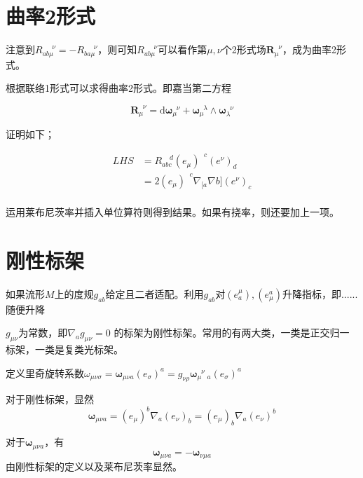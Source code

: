 \documentclass{ctexbook}
\begin{document}
\begin{e   quation}
\section{曲率2形式}

注意到$R_{ab\mu}^{\;\;\;\;\;\nu}=-R_{ba\mu}^{\;\;\;\;\;\nu}$，则可知$R_{ab\mu}^{\;\;\;\;\;\nu}$可以看作第$\mu,\nu$个2形式场$\bm{R}_{\mu}^{\;\;\nu}$，成为曲率2形式。

根据联络1形式可以求得曲率2形式。即嘉当第二方程

\begin{equation}
    \bm{R}_{\mu}^{\;\;\nu}=\mathrm{d}\bm{\omega}_{\mu}^{\;\;\nu}+\bm{\omega}_{\mu}^{\;\;\lambda}\wedge\bm{\omega}_{\lambda}^{\;\;\nu}
\end{equation}

证明如下；

\begin{equation}
    \begin{split}
        LHS
        &=R_{abc}^{\;\;\;\;d}(e_{\mu})^{\;\;c}(e^{\nu})_d\\
        &=2(e_{\mu})^{\;\;c}\nabla_{[a}\nabla{b]}(e^{\nu})_c\\
    \end{split}
\end{equation}

运用莱布尼茨率并插入单位算符则得到结果。如果有挠率，则还要加上一项。

\section{刚性标架}

如果流形$M$上的度规$g_{ab}$给定且二者适配。利用$g_{ab}$对$(e^{\mu}_a),(e_{\mu}^a)$升降指标，即......随便升降

$g_{\mu\nu}$为常数，即$\nabla_a g_{\mu\nu}=0$ 的标架为刚性标架。常用的有两大类，一类是正交归一标架，一类是复类光标架。

定义里奇旋转系数$\omega_{\mu\nu\sigma}=\bm{\omega}_{\mu\nu a}(e_{\sigma})^a=g_{\nu\rho}\bm{\omega}_{\mu\;\;\; a}^{\;\;\nu}(e_{\sigma})^a$

对于刚性标架，显然
\begin{equation}
    \bm{\omega}_{\mu\nu a}=(e_{\mu})^{b}\nabla_a(e_\nu)_{b}=(e_{\mu})_{b}\nabla_a(e_\nu)^{b}
\end{equation}

对于$\bm{\omega}_{\mu\nu a}$，有
\begin{equation}
    \bm{\omega}_{\mu\nu a}=-\bm{\omega}_{\nu\mu a}
\end{equation}
由刚性标架的定义以及莱布尼茨率显然。


\end{e   quation}
\end{document}
